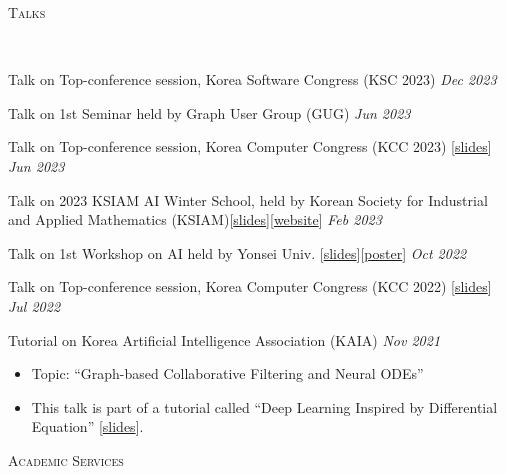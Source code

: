 \documentclass[10pt]{article}
\newenvironment{changemargin}[2]{
  \begin{list}{}{
    \setlength{\topsep}{0pt}
    \setlength{\leftmargin}{#1}
    \setlength{\rightmargin}{#2}
    \setlength{\listparindent}{\parindent}
    \setlength{\itemindent}{\parindent}
    \setlength{\parsep}{\parskip}
  }
  \item[]}{\end{list}
}
\newcommand{\lineover}{
	\begin{changemargin}{-0.05in}{-0.05in}
		\vspace*{-8pt}
		\hrulefill \\
		\vspace*{-2pt}
	\end{changemargin}
}
\newcommand{\header}[1]{
	\begin{changemargin}{-0.5in}{-0.5in}
		\scshape{#1}\\
  	\lineover
	\end{changemargin}
}
\newcommand{\award}[2]{
	{#1} \hfill \emph{#2}\\ \medskip
}
\newenvironment{body} {
	\vspace*{-16pt}
	\begin{changemargin}{-0.25in}{-0.5in}
  }
	{\end{changemargin}
}
\begin{document}
\medskip
\pagebreak
\header{Talks}

\begin{body}
	\vspace{14pt}
\award{Talk on Top-conference session, Korea Software Congress (KSC 2023)} {Dec 2023}
\award{Talk on 1st Seminar held by Graph User Group (GUG)}{Jun 2023}
\award{Talk on Top-conference session, Korea Computer Congress (KCC 2023) [\href{https://www.dropbox.com/s/34h6pmr7ftdiuzr/BSPM-KCC23.pptx?dl=0}{slides}]}{Jun 2023}
\award{Talk on 2023 KSIAM AI Winter School, held by Korean Society for Industrial and Applied Mathematics (KSIAM)[\href{https://www.dropbox.com/s/p4sd5h40hcuxcob/KSIAM23-Tutorial-ODE-RecSys.pdf?dl=0}{slides}][\href{https://ksiam.org/Conference/ConferenceView.asp?AC=3&CODE=CD20230101&CpPage=\#CONF}{website}]}{Feb 2023}
\award{Talk on 1st Workshop on AI held by Yonsei Univ. [\href{https://www.dropbox.com/s/9au5xx13qa2l529/AAAI22_workshop.pdf?dl=0}{slides}][\href{https://www.dropbox.com/s/pibzd51d76zy907/AAAI22-Yonsei_AI_Workshop.pdf?dl=0}{poster}]}{Oct 2022}
\award{Talk on Top-conference session, Korea Computer Congress (KCC 2022) [\href{https://www.dropbox.com/s/22d9d92ns8uv9qw/AAAI22_KCC22.pdf?dl=0}{slides}]}{Jul 2022}
\award{Tutorial on Korea Artificial Intelligence Association (KAIA)}{Nov 2021}
	\begin{itemize} \itemsep -0pt  %
        \item Topic: ``Graph-based Collaborative Filtering and Neural ODEs''
		\item This talk is part of a tutorial called ``Deep Learning Inspired by Differential Equation'' [\href{https://www.dropbox.com/s/1xn8xhd6llmhblz/%5BKAIA2021%5DTutorial-LT-OCF.pdf?dl=0}{slides}].
  	\end{itemize}
\end{body}

\medskip

\header{Academic Services}
\end{document}
